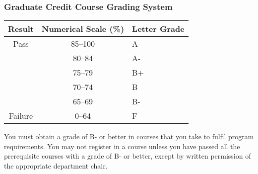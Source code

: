 \subsubsection{Graduate Credit Course Grading System}


\begin{center}
  \begin{tabular}{ccl}
     Result & Numerical Scale (\%) & Letter Grade \\
   \hline
Pass & 85--100 & A  \\
& 80--84 & A- \\
& 75--79 & B+ \\
& 70--74 & B \\
& 65--69 & B- \\
\hline
Failure & 0--64 & F
  \end{tabular}
  \end{center}

You must obtain a grade of B- or better in courses that you take to
fulfil program requirements. You may not register in a course unless you
have passed all the prerequisite courses with a grade of B- or better,
except by written permission of the appropriate department chair.
